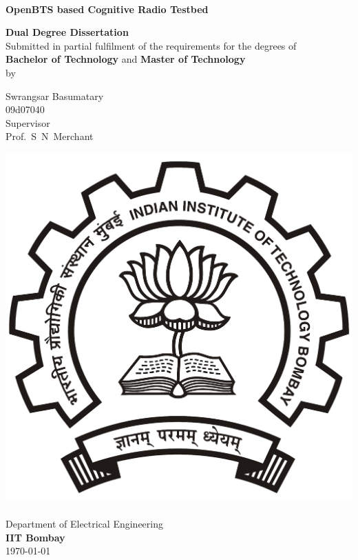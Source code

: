 \begin{titlepage}
\begin{center}
\begin{spacing}{1.0}


~\\[0.3cm]
{ \LARGE \bfseries OpenBTS based Cognitive Radio Testbed\\[1.2cm] }

\textbf{\large Dual Degree Dissertation}\\[1.2cm]

{Submitted in partial fulfilment of the requirements for the degrees 
of\\[0.1cm]
\textbf{Bachelor of Technology} and \textbf{Master of Technology}\\[0.3cm]
by\\[0.3cm]}

{\LARGE Swrangsar Basumatary \\[0.1cm]}
{09d07040 \\[1.4cm]}
{Supervisor \\[0.1cm]}
{\LARGE Prof.~S~N~Merchant \\[2cm]}

\includegraphics[width=0.21\textheight]{iitbLogo}~\\[0.9cm]
Department of Electrical Engineering\\[0.2cm]
\textbf{\large IIT Bombay}\\[1.3cm]




{\large \mydate\today}

\end{spacing}
\end{center}
\end{titlepage}
